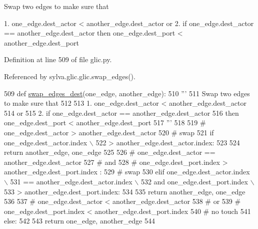 \begin{DoxyVerb}  Swap two edges to make sure that

  1. one_edge.dest_actor < another_edge.dest_actor
  or
  2. if one_edge.dest_actor == another_edge.dest_actor
     then one_edge.dest_port < another_edge.dest_port
\end{DoxyVerb}
 

Definition at line 509 of file glic.\+py.



Referenced by sylva.\+glic.\+glic.\+swap\+\_\+edges().


\begin{DoxyCode}
509     \textcolor{keyword}{def }\hyperlink{namespacesylva_1_1glic_1_1glic_a478b14bc177ffdfb87bc422a3e2fa0f1}{swap\_edges\_dest}(one\_edge, another\_edge):
510         \textcolor{stringliteral}{'''}
511 \textcolor{stringliteral}{          Swap two edges to make sure that}
512 \textcolor{stringliteral}{}
513 \textcolor{stringliteral}{          1. one\_edge.dest\_actor < another\_edge.dest\_actor}
514 \textcolor{stringliteral}{          or}
515 \textcolor{stringliteral}{          2. if one\_edge.dest\_actor == another\_edge.dest\_actor}
516 \textcolor{stringliteral}{             then one\_edge.dest\_port < another\_edge.dest\_port}
517 \textcolor{stringliteral}{        '''}
518 
519         \textcolor{comment}{# one\_edge.dest\_actor > another\_edge.dest\_actor}
520         \textcolor{comment}{# swap}
521         \textcolor{keywordflow}{if} one\_edge.dest\_actor.index \(\backslash\)
522                 > another\_edge.dest\_actor.index:
523 
524             \textcolor{keywordflow}{return} another\_edge, one\_edge
525 
526         \textcolor{comment}{# one\_edge.dest\_actor == another\_edge.dest\_actor}
527         \textcolor{comment}{# and}
528         \textcolor{comment}{# one\_edge.dest\_port.index > another\_edge.dest\_port.index :}
529         \textcolor{comment}{# swap}
530         \textcolor{keywordflow}{elif} one\_edge.dest\_actor.index \(\backslash\)
531             == another\_edge.dest\_actor.index \(\backslash\)
532             \textcolor{keywordflow}{and} one\_edge.dest\_port.index \(\backslash\)
533                 > another\_edge.dest\_port.index:
534 
535             \textcolor{keywordflow}{return} another\_edge, one\_edge
536 
537         \textcolor{comment}{# one\_edge.dest\_actor < another\_edge.dest\_actor}
538         \textcolor{comment}{# or}
539         \textcolor{comment}{# one\_edge.dest\_port.index < another\_edge.dest\_port.index}
540         \textcolor{comment}{# no touch}
541         \textcolor{keywordflow}{else}:
542 
543             \textcolor{keywordflow}{return} one\_edge, another\_edge
544 
\end{DoxyCode}
\mbox{\label{namespacesylva_1_1glic_1_1glic_a6e0ff8a8e5ef9956ef0b31be0fb0bf0e}} 
